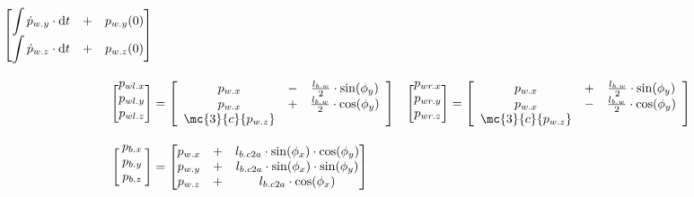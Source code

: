 \documentclass[crop=false,float=true,class=scrreprt]{standalone}
\begin{document}
\begin{align}
\begin{bmatrix}
\displaystyle\int \dot{p}_{w.y} \cdot \mathrm{d}t & + & p_{w.y}( 0 ) \\
\displaystyle\int \dot{p}_{w.z} \cdot \mathrm{d}t & + & p_{w.z}( 0 ) \\
\end{bmatrix}
\\[+1em]
\begin{bmatrix}
\hphantom{\theta_{g.av}}\\[-2em]
p_{wl.x} \\
p_{wl.y} \\
p_{wl.z} \\
\end{bmatrix}
& =
\begin{bmatrix}
\begin{array}{ccc}
          p_{w.x} & - & \frac{l_{b.w}}{2} \cdot \mathrm{sin}( \phi_{y})  \\
          p_{w.x} & + & \frac{l_{b.w}}{2} \cdot \mathrm{cos}( \phi_{y})  \\
\mc{3}{c}{p_{w.z}                                                       }\\
\end{array}
\end{bmatrix}
&
\begin{bmatrix}
\hphantom{\theta_{g.av}}\\[-2em]
p_{wr.x} \\
p_{wr.y} \\
p_{wr.z} \\
\end{bmatrix}
& =
\begin{bmatrix}
\begin{array}{ccc}
          p_{w.x} & + & \frac{l_{b.w}}{2} \cdot \mathrm{sin}( \phi_{y})  \\
          p_{w.x} & - & \frac{l_{b.w}}{2} \cdot \mathrm{cos}( \phi_{y})  \\
\mc{3}{c}{p_{w.z}                                                       }\\
\end{array}
\end{bmatrix}
\\[+1em]
\label{SEC:hwePlantDynamicsModel:nonlinear:coordinateSystem:end}
\begin{bmatrix}
\hphantom{\theta_{g.av}}\\[-2em]
p_{b.x} \\
p_{b.y} \\
p_{b.z} \\
\end{bmatrix}
& =
\begin{bmatrix}
p_{w.x} & + & l_{b.c2a} \cdot \mathrm{sin}( \phi_{x}) \cdot \mathrm{cos}( \phi_{y}) \\
p_{w.y} & + & l_{b.c2a} \cdot \mathrm{sin}( \phi_{x}) \cdot \mathrm{sin}( \phi_{y}) \\
p_{w.z} & + & l_{b.c2a} \cdot \mathrm{cos}( \phi_{x})                               \\
\end{bmatrix}
\end{align}
\end{document}
